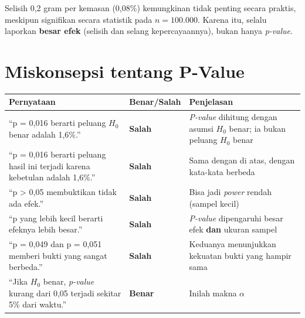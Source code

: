\documentclass[
  indonesian,
  letterpaper,
]{book}
\newcounter{none} %
\begin{document}
Selisih 0,2 gram per kemasan (0,08\%) kemungkinan tidak penting secara
praktis, meskipun signifikan secara statistik pada \(n = 100.000\).
Karena itu, selalu laporkan \textbf{besar efek} (selisih dan selang
kepercayaannya), bukan hanya \emph{p-value}.

\section{Miskonsepsi tentang P-Value}\label{miskonsepsi-tentang-p-value}

{\def\LTcaptype{none} %
\begin{longtable}[]{@{}
  >{\raggedright\arraybackslash}p{}
  >{\raggedright\arraybackslash}p{}
  >{\raggedright\arraybackslash}p{}@{}}
\toprule\noalign{}
\begin{minipage}[b]{\linewidth}\raggedright
Pernyataan
\end{minipage} & \begin{minipage}[b]{\linewidth}\raggedright
Benar/Salah
\end{minipage} & \begin{minipage}[b]{\linewidth}\raggedright
Penjelasan
\end{minipage} \\
\midrule\noalign{}
\endhead
\bottomrule\noalign{}
\endlastfoot
``p = 0,016 berarti peluang \(H_0\) benar adalah 1,6\%.'' &
\textbf{Salah} & \emph{P-value} dihitung dengan asumsi \(H_0\) benar; ia
bukan peluang \(H_0\) benar \\
``p = 0,016 berarti peluang hasil ini terjadi karena kebetulan adalah
1,6\%.'' & \textbf{Salah} & Sama dengan di atas, dengan kata-kata
berbeda \\
``p \textgreater{} 0,05 membuktikan tidak ada efek.'' & \textbf{Salah} &
Bisa jadi \emph{power} rendah (sampel kecil) \\
``p yang lebih kecil berarti efeknya lebih besar.'' & \textbf{Salah} &
\emph{P-value} dipengaruhi besar efek \textbf{dan} ukuran sampel \\
``p = 0,049 dan p = 0,051 memberi bukti yang sangat berbeda.'' &
\textbf{Salah} & Keduanya menunjukkan kekuatan bukti yang hampir sama \\
``Jika \(H_0\) benar, \emph{p-value} kurang dari 0,05 terjadi sekitar
5\% dari waktu.'' & \textbf{Benar} & Inilah makna \(\alpha\) \\
\end{longtable}
}
\end{document}
